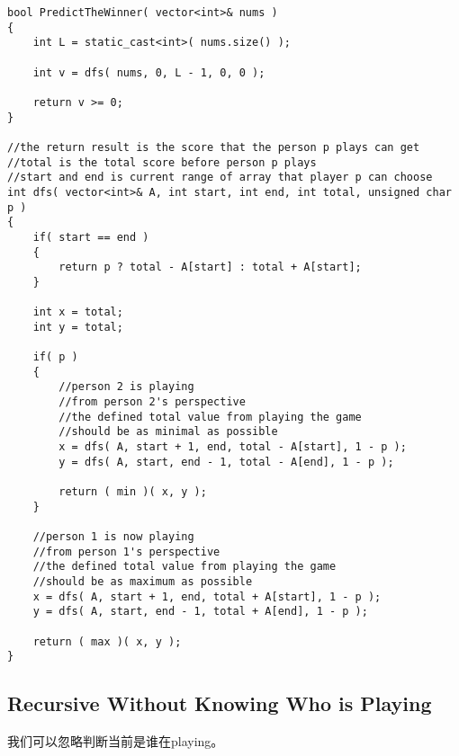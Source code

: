 \setcounter{lstlisting}{0}
\begin{lstlisting}[style=customc, caption={Min-Max Recursive Approach}]
bool PredictTheWinner( vector<int>& nums )
{
    int L = static_cast<int>( nums.size() );

    int v = dfs( nums, 0, L - 1, 0, 0 );

    return v >= 0;
}

//the return result is the score that the person p plays can get
//total is the total score before person p plays
//start and end is current range of array that player p can choose
int dfs( vector<int>& A, int start, int end, int total, unsigned char p )
{
    if( start == end )
    {
        return p ? total - A[start] : total + A[start];
    }

    int x = total;
    int y = total;

    if( p )
    {
        //person 2 is playing
        //from person 2's perspective
        //the defined total value from playing the game
        //should be as minimal as possible
        x = dfs( A, start + 1, end, total - A[start], 1 - p );
        y = dfs( A, start, end - 1, total - A[end], 1 - p );

        return ( min )( x, y );
    }

    //person 1 is now playing
    //from person 1's perspective
    //the defined total value from playing the game
    //should be as maximum as possible
    x = dfs( A, start + 1, end, total + A[start], 1 - p );
    y = dfs( A, start, end - 1, total + A[end], 1 - p );

    return ( max )( x, y );
}

\end{lstlisting}

\subsection{Recursive Without Knowing Who is Playing}
我们可以忽略判断当前是谁在playing。

